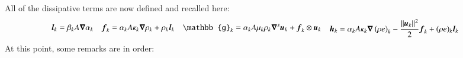 \documentclass[preprint,10pt]{elsarticle}
\begin{document}
All of the dissipative terms are now defined and recalled here:
%
\begin{subequations}\label{eq:visc-reg-7-equ-sect4}
\begin{align}
  \mbold l_k &= \beta_k A \grad \alpha_k 
\end{align}
\begin{align}
  \mbold f_k &= \alpha_k A \kappa_k \grad \rho_k + \rho_k  \mbold l_k 
\end{align}
\begin{align}
\mathbb{g}_k &= \alpha_k A \mu_k \rho_k \grad^s \mbold u_k + \mbold f_k \otimes \mbold u_k 
\end{align}
\begin{align}
  \mbold h_k &=  \alpha_k A \kappa_k \grad \left( \rho e \right)_k  - \frac{\| \mbold u_k \|^2}{2} \mbold f_k + (\rho e)_k \mbold l_k 
\end{align}
\end{subequations}
%
At this point, some remarks are in order:
\end{document}
